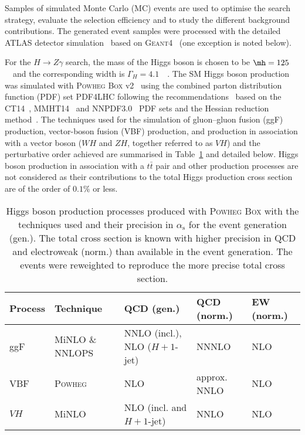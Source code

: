 Samples of simulated Monte Carlo (MC) events are used to optimise the search strategy, 
evaluate the selection
efficiency and to study the different background contributions. The 
generated event samples were processed with the detailed ATLAS detector simulation~\cite{ATLAS-SIM} 
based on \textsc{Geant4}~\cite{Geant4} (one exception
is noted below).

For the $H\to Z\gamma$ search, the mass
of the Higgs boson is chosen to be $\mh = 125$~\GeV\ and the corresponding width is 
$\Gamma_H = 4.1$~\MeV~\cite{deFlorian:2016spz}.
The SM Higgs boson production was simulated with 
\textsc{Powheg Box} v2~\cite{Nason:2004rx, Frixione:2007vw, Alioli:2010xd}
using the combined parton distribution function (PDF) set PDF4LHC following the
recommendations~\cite{Butterworth:2015oua} based on the CT14~\cite{Dulat:2015mca}, 
MMHT14~\cite{Harland-Lang:2014zoa} and NNPDF3.0~\cite{Ball:2014uwa} PDF sets and the
Hessian reduction method~\cite{Gao:2013bia, Carrazza:2015aoa, Watt:2012tq}.
The techniques used
for the simulation of gluon--gluon fusion (ggF) production, vector-boson fusion (VBF) production, and
production in association with a vector boson  ($WH$ and $ZH$, together referred to as $VH$) 
and the perturbative order achieved
are summarised in Table~\ref{tab:samples} and detailed below. 
Higgs boson production in association with a $t\bar{t}$ pair and other production
processes are not considered as their contributions to the total Higgs production cross section
are of the order of $0.1\%$ or less.

\begin{table}[htbp]
\caption{Higgs boson production processes produced with \textsc{Powheg Box} with the techniques
used and their precision in $\alpha_\mathrm{s}$ for the event generation (gen.). The total cross section
is known with higher precision in QCD and electroweak (norm.) than available in the event 
generation. The events
were reweighted to reproduce the more precise total cross section.}
\label{tab:samples}
\begin{center}
\begin{tabular}{lllll}
\hline\hline
Process & Technique        & QCD (gen.) & QCD (norm.) & EW (norm.)\\
\hline
ggF     & MiNLO \& NNLOPS & NNLO (incl.), NLO ($H + 1$-jet) & NNNLO      & NLO \\
VBF     & \textsc{Powheg}            & NLO                      & approx. NNLO & NLO \\
$VH$    & MiNLO            & NLO (incl. and $H + 1$-jet) & NNLO         & NLO \\
\hline\hline
\end{tabular}
\end{center}
\end{table}
 
